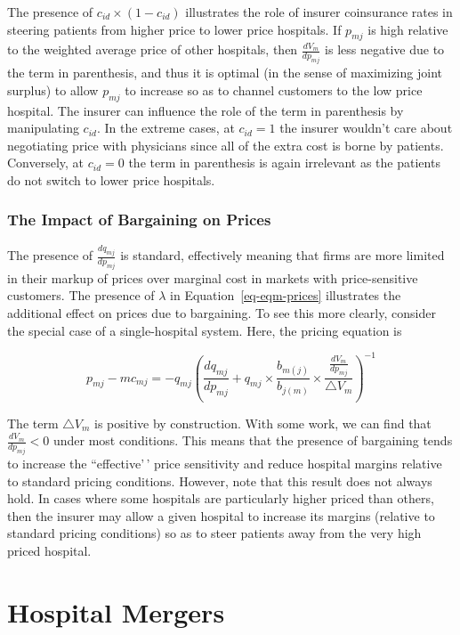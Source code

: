 \documentclass[
  letterpaper,
  DIV=11,
  numbers=noendperiod]{scrreport}
\theoremstyle{definition}
\theoremstyle{remark}
\begin{document}
The presence of \(c_{id}\times (1-c_{id})\) illustrates the role of
insurer coinsurance rates in steering patients from higher price to
lower price hospitals. If \(p_{mj}\) is high relative to the weighted
average price of other hospitals, then \(\frac{d V_{m}}{d p_{mj}}\) is
less negative due to the term in parenthesis, and thus it is optimal (in
the sense of maximizing joint surplus) to allow \(p_{mj}\) to increase
so as to channel customers to the low price hospital. The insurer can
influence the role of the term in parenthesis by manipulating
\(c_{id}\). In the extreme cases, at \(c_{id}=1\) the insurer wouldn't
care about negotiating price with physicians since all of the extra cost
is borne by patients. Conversely, at \(c_{id}=0\) the term in
parenthesis is again irrelevant as the patients do not switch to lower
price hospitals.

\hypertarget{the-impact-of-bargaining-on-prices}{%
\subsection{The Impact of Bargaining on
Prices}\label{the-impact-of-bargaining-on-prices}}

The presence of \(\frac{d q_{mj}}{d p_{mj}}\) is standard, effectively
meaning that firms are more limited in their markup of prices over
marginal cost in markets with price-sensitive customers. The presence of
\(\lambda\) in Equation~\ref{eq-eqm-prices} illustrates the additional
effect on prices due to bargaining. To see this more clearly, consider
the special case of a single-hospital system. Here, the pricing equation
is

\[p_{mj} - mc_{mj} = -q_{mj} \left(\frac{d q_{mj}}{d p_{mj}} + q_{mj} \times \frac{b_{m(j)}}{b_{j(m)}} \times \frac{\frac{d V_{m}}{d p_{mj}}}{\triangle V_{m}} \right)^{-1}\]

The term \(\triangle V_{m}\) is positive by construction. With some
work, we can find that \(\frac{d V_{m}}{d p_{mj}}<0\) under most
conditions. This means that the presence of bargaining tends to increase
the ``effective'\,' price sensitivity and reduce hospital margins
relative to standard pricing conditions. However, note that this result
does not always hold. In cases where some hospitals are particularly
higher priced than others, then the insurer may allow a given hospital
to increase its margins (relative to standard pricing conditions) so as
to steer patients away from the very high priced hospital.

\hypertarget{hospital-mergers}{%
\chapter{Hospital Mergers}\label{hospital-mergers}}
\end{document}

